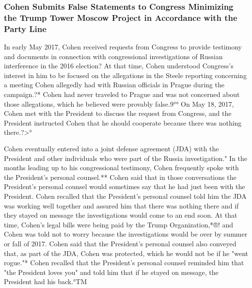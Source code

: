 \subsubsection{Cohen Submits False Statements to Congress Minimizing the Trump Tower Moscow Project in Accordance with the Party Line}

In early May 2017, Cohen received requests from Congress to provide testimony and documents in connection with congressional investigations of Russian interference in the 2016 election?
At that time, Cohen understood Congress's interest in him to be focused on the allegations in the Steele reporting concerning a meeting Cohen allegedly had with Russian officials in Prague during the campaign.?*
Cohen had never traveled to Prague and was not concerned about those allegations, which he believed were provably false.9°°
On May 18, 2017, Cohen met with the President to discuss the request from Congress, and the President instructed Cohen that he should cooperate because there was nothing there.?>°

Cohen eventually entered into a joint defense agreement (JDA) with the President and other individuals who were part of the Russia investigation."
In the months leading up to his congressional testimony, Cohen frequently spoke with the President's personal counsel.**
Cohen said that in those conversations the President's personal counsel would sometimes say that he had just been with the President.
Cohen recalled that the President's personal counsel told him the JDA was working well together and assured him that there was nothing there and if they stayed on message the investigations would come to an end soon.
At that time, Cohen's legal bills were being paid by the Trump Organization,*®!
and Cohen was told not to worry because the investigations would be over by summer or fall of 2017.
Cohen said that the President's personal counsel also conveyed that, as part of the JDA, Cohen was protected, which he would not be if he "went rogue."*
Cohen recalled that the President's personal counsel reminded him that "the President loves you" and told him that if he stayed on message, the President had his back.°TM

